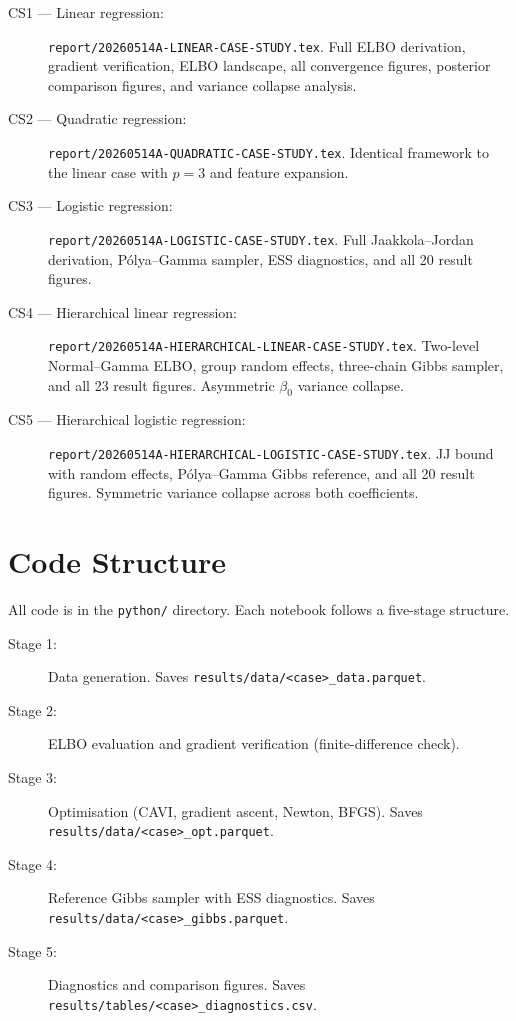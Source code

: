 \documentclass[11pt,a4paper]{article}
\begin{document}
\begin{description}
  \item[CS1 --- Linear regression:] \texttt{report/20260514A-LINEAR-CASE-STUDY.tex}.
    Full ELBO derivation, gradient verification, ELBO landscape, all convergence
    figures, posterior comparison figures, and variance collapse analysis.
  \item[CS2 --- Quadratic regression:] \texttt{report/20260514A-QUADRATIC-CASE-STUDY.tex}.
    Identical framework to the linear case with $p=3$ and feature expansion.
  \item[CS3 --- Logistic regression:] \texttt{report/20260514A-LOGISTIC-CASE-STUDY.tex}.
    Full Jaakkola--Jordan derivation, P\'{o}lya--Gamma sampler, ESS diagnostics,
    and all 20 result figures.
  \item[CS4 --- Hierarchical linear regression:] \texttt{report/20260514A-HIERARCHICAL-LINEAR-CASE-STUDY.tex}.
    Two-level Normal--Gamma ELBO, group random effects, three-chain Gibbs sampler,
    and all 23 result figures. Asymmetric $\beta_0$ variance collapse.
  \item[CS5 --- Hierarchical logistic regression:] \texttt{report/20260514A-HIERARCHICAL-LOGISTIC-CASE-STUDY.tex}.
    JJ bound with random effects, P\'{o}lya--Gamma Gibbs reference,
    and all 20 result figures. Symmetric variance collapse across both coefficients.
\end{description}

\section{Code Structure}
\label{app:code}

All code is in the \texttt{python/} directory.
Each notebook follows a five-stage structure.

\begin{description}
  \item[Stage 1:] Data generation. Saves \texttt{results/data/<case>\_data.parquet}.
  \item[Stage 2:] ELBO evaluation and gradient verification (finite-difference check).
  \item[Stage 3:] Optimisation (CAVI, gradient ascent, Newton, BFGS).
    Saves \texttt{results/data/<case>\_opt.parquet}.
  \item[Stage 4:] Reference Gibbs sampler with ESS diagnostics.
    Saves \texttt{results/data/<case>\_gibbs.parquet}.
  \item[Stage 5:] Diagnostics and comparison figures.
    Saves \texttt{results/tables/<case>\_diagnostics.csv}.
\end{description}
\end{document}
